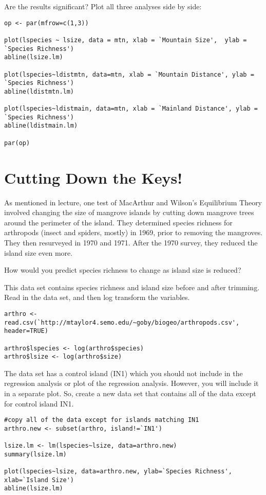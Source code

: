\documentclass[11pt, oneside]{article}   	%
\begin{document}
Are the results significant?  Plot all three analyses side by side:

\begin{lstlisting}
op <- par(mfrow=c(1,3))

plot(lspecies ~ lsize, data = mtn, xlab = `Mountain Size',  ylab = `Species Richness')
abline(lsize.lm)

plot(lspecies~ldistmtn, data=mtn, xlab = `Mountain Distance', ylab = `Species Richness')
abline(ldistmtn.lm)

plot(lspecies~ldistmain, data=mtn, xlab = `Mainland Distance', ylab = `Species Richness')
abline(ldistmain.lm)

par(op)
\end{lstlisting}

\section{Cutting Down the Keys!}

As mentioned in lecture, one test of MacArthur and Wilson's Equilibrium Theory involved changing the size of mangrove islands by cutting down mangrove trees around the perimeter of the island.  They determined species richness for arthropods (insect and spiders, mostly) in 1969, prior to removing the mangroves. They then resurveyed in 1970 and 1971.  After the 1970 survey, they reduced the island size even more. 

How would you predict species richness to change as island size is reduced?

This data set contains species richness and island size before and after trimming.  Read in the data set, and then log transform the variables.

\begin{lstlisting}
arthro <- read.csv(`http://mtaylor4.semo.edu/~goby/biogeo/arthropods.csv', header=TRUE)

arthro$lspecies <- log(arthro$species)
arthro$lsize <- log(arthro$size)

\end{lstlisting}

The data set has a control island (IN1) which you should not include in the regression analysis or plot of the regression analysis.  However, you will include it in a separate plot.  So,  create a new data set that contains all of the data except for control island IN1.

\begin{lstlisting}
#copy all of the data except for islands matching IN1
arthro.new <- subset(arthro, island!=`IN1')  

lsize.lm <- lm(lspecies~lsize, data=arthro.new)
summary(lsize.lm)

plot(lspecies~lsize, data=arthro.new, ylab=`Species Richness', xlab=`Island Size')
abline(lsize.lm)

\end{lstlisting}
\end{document}
